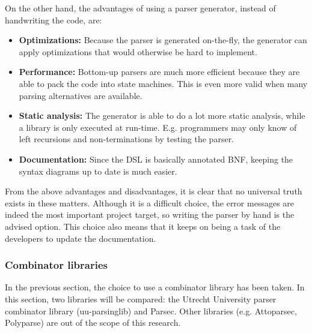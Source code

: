 \noindent
On the other hand, the advantages of using a parser generator, instead of handwriting the code, are:
\begin{itemize}
	\item \textbf{Optimizations:} Because the parser is generated on-the-fly, the generator can apply optimizations that would otherwise be hard to implement.
	\item \textbf{Performance:} Bottom-up parsers are much more efficient because they are able to pack the code into state machines.
		This is even more valid when many parsing alternatives are available.
	\item \textbf{Static analysis:} The generator is able to do a lot more static analysis, while a library is only executed at run-time.
    E.g. programmers may only know of left recursions and non-terminations by testing the parser.
	\item \textbf{Documentation:} Since the DSL is basically annotated BNF, keeping the syntax diagrams up to date is much easier.
\end{itemize}

\noindent
From the above advantages and disadvantages, it is clear that no universal truth exists in these matters.
Although it is a difficult choice, the error messages are indeed the most important project target, so writing the parser by hand is the advised option.
This choice also means that it keeps on being a task of the developers to update the documentation.

\subsubsection{Combinator libraries}
In the previous section, the choice to use a combinator library has been taken.
In this section, two libraries will be compared: the Utrecht University parser combinator library (uu-parsinglib) and Parsec.
Other libraries (e.g. Attoparsec, Polyparse) are out of the scope of this research.

